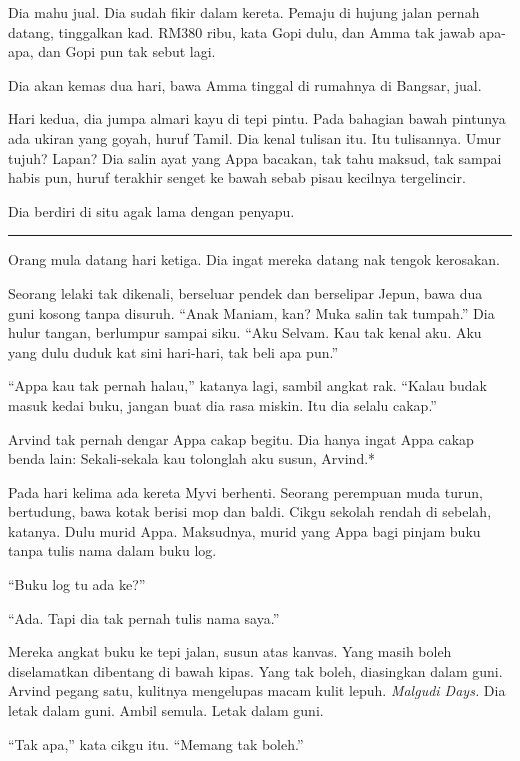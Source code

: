 \documentclass[
  11pt,
  a5paper,
  openany,
  oneside]{book}
\begin{document}
Dia mahu jual. Dia sudah fikir dalam kereta. Pemaju di hujung jalan
pernah datang, tinggalkan kad. RM380 ribu, kata Gopi dulu, dan Amma tak
jawab apa-apa, dan Gopi pun tak sebut lagi.

Dia akan kemas dua hari, bawa Amma tinggal di rumahnya di Bangsar, jual.

Hari kedua, dia jumpa almari kayu di tepi pintu. Pada bahagian bawah
pintunya ada ukiran yang goyah, huruf Tamil. Dia kenal tulisan itu. Itu
tulisannya. Umur tujuh? Lapan? Dia salin ayat yang Appa bacakan, tak
tahu maksud, tak sampai habis pun, huruf terakhir senget ke bawah sebab
pisau kecilnya tergelincir.

Dia berdiri di situ agak lama dengan penyapu.

\begin{center}\rule{0.5\linewidth}{0.5pt}\end{center}

Orang mula datang hari ketiga. Dia ingat mereka datang nak tengok
kerosakan.

Seorang lelaki tak dikenali, berseluar pendek dan berselipar Jepun, bawa
dua guni kosong tanpa disuruh. ``Anak Maniam, kan? Muka salin tak
tumpah.'' Dia hulur tangan, berlumpur sampai siku. ``Aku Selvam. Kau tak
kenal aku. Aku yang dulu duduk kat sini hari-hari, tak beli apa pun.''

``Appa kau tak pernah halau,'' katanya lagi, sambil angkat rak. ``Kalau
budak masuk kedai buku, jangan buat dia rasa miskin. Itu dia selalu
cakap.''

Arvind tak pernah dengar Appa cakap begitu. Dia hanya ingat Appa cakap
benda lain: Sekali-sekala kau tolonglah aku susun, Arvind.*

Pada hari kelima ada kereta Myvi berhenti. Seorang perempuan muda turun,
bertudung, bawa kotak berisi mop dan baldi. Cikgu sekolah rendah di
sebelah, katanya. Dulu murid Appa. Maksudnya, murid yang Appa bagi
pinjam buku tanpa tulis nama dalam buku log.

``Buku log tu ada ke?''

``Ada. Tapi dia tak pernah tulis nama saya.''

Mereka angkat buku ke tepi jalan, susun atas kanvas. Yang masih boleh
diselamatkan dibentang di bawah kipas. Yang tak boleh, diasingkan dalam
guni. Arvind pegang satu, kulitnya mengelupas macam kulit lepuh.
\emph{Malgudi Days.} Dia letak dalam guni. Ambil semula. Letak dalam
guni.

``Tak apa,'' kata cikgu itu. ``Memang tak boleh.''
\end{document}
